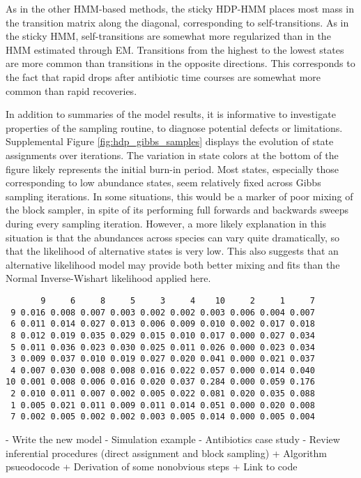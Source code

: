\documentclass[14pt]{extreport}
\begin{document}
As in the other HMM-based methods, the sticky HDP-HMM places most mass in the
transition matrix along the diagonal, corresponding to self-transitions. As in
the sticky HMM, self-transitions are somewhat more regularized than in the HMM
estimated through EM. Transitions from the highest to the lowest states are more
common than transitions in the opposite directions. This corresponds to the fact
that rapid drops after antibiotic time courses are somewhat more common than
rapid recoveries.

In addition to summaries of the model results, it is informative to investigate
properties of the sampling routine, to diagnose potential defects or
limitations. Supplemental Figure \ref{fig:hdp_gibbs_samples} displays the
evolution of state assignments over iterations. The variation in state colors at
the bottom of the figure likely represents the initial burn-in period. Most
states, especially those corresponding to low abundance states, seem relatively
fixed across Gibbs sampling iterations. In some situations, this would be a
marker of poor mixing of the block sampler, in spite of its performing full
forwards and backwards sweeps during every sampling iteration. However, a more
likely explanation in this situation is that the abundances across species can
vary quite dramatically, so that the likelihood of alternative states is very
low. This also suggests that an alternative likelihood model may provide both
better mixing and fits than the Normal Inverse-Wishart likelihood applied here.

\begin{verbatim}
       9     6     8     5     3     4    10     2     1     7
 9 0.016 0.008 0.007 0.003 0.002 0.002 0.003 0.006 0.004 0.007
 6 0.011 0.014 0.027 0.013 0.006 0.009 0.010 0.002 0.017 0.018
 8 0.012 0.019 0.035 0.029 0.015 0.010 0.017 0.000 0.027 0.034
 5 0.011 0.036 0.023 0.030 0.025 0.011 0.026 0.000 0.023 0.034
 3 0.009 0.037 0.010 0.019 0.027 0.020 0.041 0.000 0.021 0.037
 4 0.007 0.030 0.008 0.008 0.016 0.022 0.057 0.000 0.014 0.040
10 0.001 0.008 0.006 0.016 0.020 0.037 0.284 0.000 0.059 0.176
 2 0.010 0.011 0.007 0.002 0.005 0.022 0.081 0.020 0.035 0.088
 1 0.005 0.021 0.011 0.009 0.011 0.014 0.051 0.000 0.020 0.008
 7 0.002 0.005 0.002 0.002 0.003 0.005 0.014 0.000 0.005 0.004
\end{verbatim}

- Write the new model
- Simulation example
- Antibiotics case study
- Review inferential procedures (direct assignment and block sampling)
  + Algorithm psueodocode
  + Derivation of some nonobvious steps
  + Link to code
\end{document}
